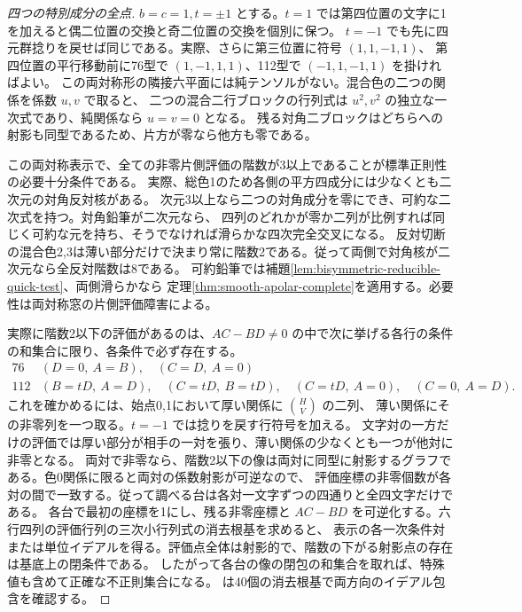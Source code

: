 \begin{proof}[四つの特別成分の全点]
$b=c=1,t=\pm1$ とする。$t=1$ では第四位置の文字に1を加えると偶二位置の交換と奇二位置の交換を個別に保つ。
$t=-1$ でも先に四元群捻りを戻せば同じである。実際、さらに第三位置に符号 $(1,1,-1,1)$、
第四位置の平行移動前に76型で $(1,-1,1,1)$、112型で $(-1,1,-1,1)$ を掛ければよい。
この両対称形の隣接六平面には純テンソルがない。混合色の二つの関係を係数 $u,v$ で取ると、
二つの混合二行ブロックの行列式は $u^2,v^2$ の独立な一次式であり、純関係なら $u=v=0$ となる。
残る対角二ブロックはどちらへの射影も同型であるため、片方が零なら他方も零である。

この両対称表示で、全ての非零片側評価の階数が3以上であることが標準正則性の必要十分条件である。
実際、総色1のため各側の平方四成分には少なくとも二次元の対角反対核がある。
次元3以上なら二つの対角成分を零にでき、可約な二次式を持つ。対角鉛筆が二次元なら、
四列のどれかが零か二列が比例すれば同じく可約な元を持ち、そうでなければ滑らかな四次完全交叉になる。
反対切断の混合色2,3は薄い部分だけで決まり常に階数2である。従って両側で対角核が二次元なら全反対階数は8である。
可約鉛筆では補題\ref{lem:bisymmetric-reducible-quick-test}、両側滑らかなら
定理\ref{thm:smooth-apolar-complete}を適用する。必要性は両対称窓の片側評価障害による。

実際に階数2以下の評価があるのは、$AC-BD\ne0$ の中で次に挙げる各行の条件の和集合に限り、各条件で必ず存在する。
\[
\begin{array}{c|l}
76 &(D=0,\ A=B),\quad(C=D,\ A=0)\\
112 &(B=tD,\ A=D),\quad(C=tD,\ B=tD),\quad(C=tD,\ A=0),\quad(C=0,\ A=D).
\end{array}
\]
これを確かめるには、始点0,1において厚い関係に $\binom{H}{V}$ の二列、
薄い関係にその非零列を一つ取る。$t=-1$ では捻りを戻す行符号を加える。
文字対の一方だけの評価では厚い部分が相手の一対を張り、薄い関係の少なくとも一つが他対に非零となる。
両対で非零なら、階数2以下の像は両対に同型に射影するグラフである。色0関係に限ると両対の係数射影が可逆なので、
評価座標の非零個数が各対の間で一致する。従って調べる台は各対一文字ずつの四通りと全四文字だけである。
各台で最初の座標を1にし、残る非零座標と $AC-BD$ を可逆化する。六行四列の評価行列の三次小行列式の消去根基を求めると、
表示の各一次条件対または単位イデアルを得る。評価点全体は射影的で、階数の下がる射影点の存在は基底上の閉条件である。
したがって各台の像の閉包の和集合を取れば、特殊値も含めて正確な不正則集合になる。
 は40個の消去根基で両方向のイデアル包含を確認する。
\end{proof}


